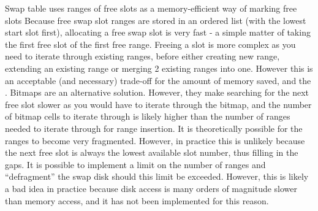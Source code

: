 Swap table
	uses ranges of free slots as a memory-efficient way of marking free slots
	Because free swap slot ranges are stored in an ordered list (with the lowest start slot first), allocating a free swap slot is very fast - a simple matter of taking the first free slot of the first free range.
	Freeing a slot is more complex as you need to iterate through existing ranges, before either creating new range, extending an existing range or merging 2 existing ranges into one. However this is an acceptable (and necessary) trade-off for the amount of memory saved, and the .
	Bitmaps are an alternative solution. However, they make searching for the next free slot slower as you would have to iterate through the bitmap, and the number of bitmap cells to iterate through is likely higher than the number of ranges needed to iterate through for range insertion.
	It is theoretically possible for the ranges to become very fragmented. However, in practice this is unlikely because the next free slot is always the lowest available slot number, thus filling in the gaps. It is possible to implement a limit on the number of ranges and ``defragment'' the swap disk should this limit be exceeded. However, this is likely a bad idea in practice because disk access is many orders of magnitude slower than memory access, and it has not been implemented for this reason.

